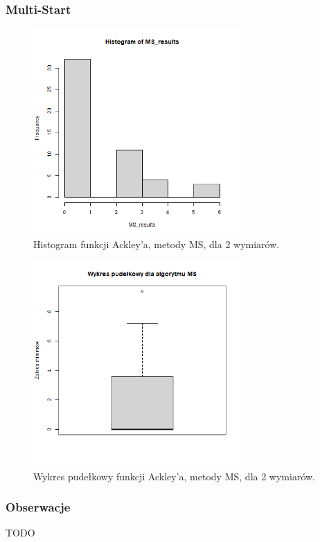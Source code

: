 \documentclass{lab}
\begin{document}
\subsubsection{Multi-Start}
\begin{figure}[H]
  \centering
  \includegraphics[width=0.7\textwidth]{img/dim2_MS_Ackley_his.png}
  \caption{Histogram funkcji Ackley'a, metody MS, dla 2 wymiarów.}
\end{figure}
\begin{figure}[H]
  \centering
  \includegraphics[width=0.7\textwidth]{img/dim2_MS_Ackley.png}
  \caption{Wykres pudełkowy funkcji Ackley'a, metody MS, dla 2 wymiarów.}
\end{figure}

\subsubsection{Obserwacje}
TODO
\end{document}
